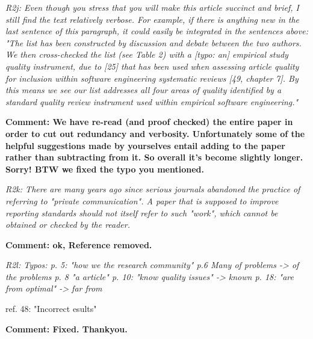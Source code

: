 \documentclass[preprint,10pt]{elsarticle}
\begin{document}
{\em
R2j: 
Even though you stress that you will make this article succinct and brief, I still find the text relatively verbose. For example, if there is anything new in the last sentence of this paragraph, it could easily be integrated in the sentences above: "The list has been constructed by discussion and debate between the two authors. We then cross-checked the list (see Table 2) with a [typo: an] empirical study quality instrument, due to [25] that has been used when assessing article quality for inclusion within software engineering systematic reviews [49, chapter 7]. By this means we see our list addresses all four areas of quality identified by a standard quality review instrument used within empirical software engineering."
}

{\bf Comment: We have re-read (and proof checked) the entire paper in order to cut out redundancy and verbosity.  Unfortunately some of the helpful suggestions made by yourselves entail adding to the paper rather than subtracting from it.  So overall it's become slightly longer.  Sorry!  BTW we fixed the typo you mentioned.}

{\em
R2k: 
There are many years ago since serious journals abandoned the practice of referring to "private communication". A paper that is supposed to improve reporting standards should not itself refer to such "work", which cannot be obtained or checked by the reader.

}

{\bf Comment: ok, Reference removed.}

{\em
R2l: 
Typos: 
p. 5: "how we the research community"
p.6 Many of problems -> of the problems
p. 8 "a article"
p. 10: "know quality issues" -> known
p. 18: "are from optimal" -> far from

ref. 48:  "Incorrect esults"

}

{\bf Comment: Fixed.  Thankyou.}
\end{document}
